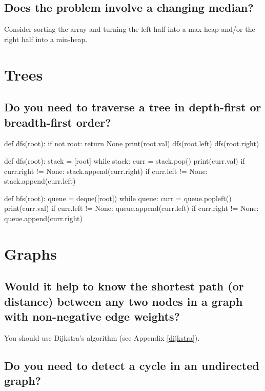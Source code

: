 \documentclass[12pt, titlepage]{article}
\begin{document}
\subsection{Does the problem involve a changing median?}

Consider sorting the array and turning the left half into a max-heap and/or the right half into a min-heap.

\section{Trees}

\subsection{Do you need to traverse a tree in depth-first or breadth-first order?}

\begin{python}
def dfs(root):
    if not root:
        return None
    print(root.val)
    dfs(root.left)
    dfs(root.right)
\end{python}

\begin{python}
def dfs(root):
    stack = [root]
    while stack:
    curr = stack.pop()
    print(curr.val)
    if curr.right != None:
        stack.append(curr.right)
    if curr.left != None:
        stack.append(curr.left)
\end{python}

\begin{python}
def bfs(root):
    queue = deque([root])
    while queue:
    curr = queue.popleft()
    print(curr.val)
    if curr.left != None:
        queue.append(curr.left)
    if curr.right != None:
        queue.append(curr.right)
\end{python}

\section{Graphs}

\subsection{Would it help to know the shortest path (or distance) between any two nodes in a graph with non-negative edge weights?}

You should use Dijkstra's algorithm (see Appendix \ref{dijkstra}).

\subsection{Do you need to detect a cycle in an undirected graph?}
\end{document}

